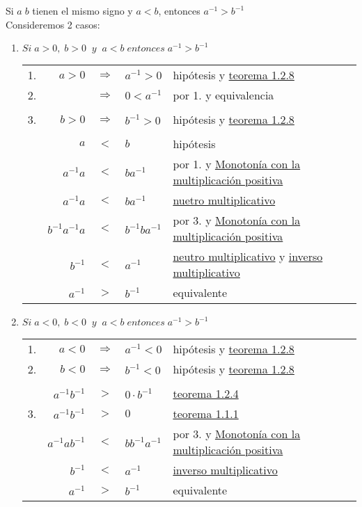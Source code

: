 \begin{teo}
Si $a \; b$ tienen el mismo signo y $a<b$, entonces $a^{-1}>b^{-1}$ \\ \label{teo 1.2.9}
Consideremos 2 casos:
\begin{enumerate}[1.]
\item $Si \; a>0, \; b>0 \; \; y \;  \; a<b \; entonces \; a^{-1}>b^{-1}$ 
\begin{center}
\begin{tabular}{c r c l l}
1.&$a>0$&$\Rightarrow$&$a^{-1}>0$&hipótesis y \hyperref[teo 1.2.8]{teorema 1.2.8}\\
2.&&$\Rightarrow$&$0<a^{-1}$&por 1. y equivalencia\\\\
3.&$b>0$&$\Rightarrow$&$b^{-1}>0$&hipótesis y \hyperref[teo 1.2.8]{teorema 1.2.8}\\\\
&$a$&$<$&$b$&hipótesis\\
&$a^{-1}a$&$<$&$ba^{-1}$&por 1. y \hyperref[O4]{Monotonía con la multiplicación positiva}\\
&$a^{-1}a$&$<$&$ba^{-1}$&\hyperref[M4]{nuetro multiplicativo}\\
&$b^{-1}a^{-1}a$&$<$&$b^{-1}ba^{-1}$&por 3. y \hyperref[O4]{Monotonía con la multiplicación positiva}\\
&$b^{-1}$&$<$&$a^{-1}$&\hyperref[M4]{neutro multiplicativo} y \hyperref[M5]{inverso multiplicativo}\\
&$a^{-1}$&$>$&$b^{-1}$&equivalente\\
\end{tabular}
\end{center}
\item $Si \; a<0, \; b<0 \; \; y \; \; a<b\; entonces \; a^{-1}>b^{-1}$
\begin{center}
\begin{tabular}{c r c l l}
1.&$a<0$&$\Rightarrow$&$a^{-1}<0$&hipótesis y \hyperref[teo 1.2.8]{teorema 1.2.8}\\
2.&$b<0$&$\Rightarrow$&$b^{-1}<0$&hipótesis y \hyperref[teo 1.2.8]{teorema 1.2.8}\\\\
&$a^{-1}b^{-1}$&$>$&$0\cdot b^{-1}$&\hyperref[teo 1.2.4]{teorema 1.2.4}\\
3.&$a^{-1}b^{-1}$&$>$&$0$&\hyperref[teo 1.1.1]{teorema 1.1.1}\\
&$a^{-1}ab^{-1}$&$<$&$bb^{-1}a^{-1}$&por 3. y \hyperref[O4]{Monotonía con la multiplicación positiva}\\
&$b^{-1}$&$<$&$a^{-1}$&\hyperref[M5]{inverso multiplicativo}\\
&$a^{-1}$&$>$&$b^{-1}$&equivalente\\
\end{tabular}
\end{center}
\end{enumerate}
\end{teo}


